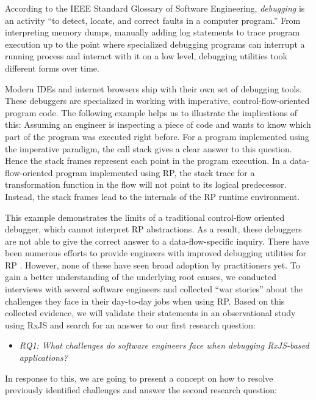 \documentclass[sigplan,screen]{acmart}
\begin{document}
According to the IEEE Standard Glossary of Software Engineering, \emph{debugging} is an activity ``to detect, locate, and correct faults in a computer program.''\cite{ieeeglossary} From interpreting memory dumps, manually adding log statements to trace program execution up to the point where specialized debugging programs can interrupt a running process and interact with it on a low level, debugging utilities took different forms over time.

Modern IDEs and internet browsers ship with their own set of debugging tools. These debuggers are specialized in working with imperative, control-flow-oriented program code. The following example helps us to illustrate the implications of this: Assuming an engineer is inspecting a piece of code and wants to know which part of the program was executed right before. For a program implemented using the imperative paradigm, the call stack gives a clear answer to this question. Hence the stack frames represent each point in the program execution. In a data-flow-oriented program implemented using RP, the stack trace for a transformation function in the flow will not point to its logical predecessor. Instead, the stack frames lead to the internals of the RP runtime environment.

This example demonstrates the limits of a traditional control-flow oriented debugger, which cannot interpret RP abstractions. As a result, these debuggers are not able to give the correct answer to a data-flow-specific inquiry. There have been numerous efforts to provide engineers with improved debugging utilities for RP \cite{10.1145/2577080.2577083} \cite{10.1145/2884781.2884815} \cite{10.1145/3180155.3180156}. However, none of these have seen broad adoption by practitioners yet. To gain a better understanding of the underlying root causes, we conducted interviews with several software engineers and collected ``war stories'' about the challenges they face in their day-to-day jobs when using RP. Based on this collected evidence, we will validate their statements in an observational study using RxJS and search for an answer to our first research question:

\begin{itemize}
	\item \emph{RQ1: What challenges do software engineers face when debugging RxJS-based applications?}
\end{itemize}

In response to this, we are going to present a concept on how to resolve previously identified challenges and answer the second research question:
\end{document}
